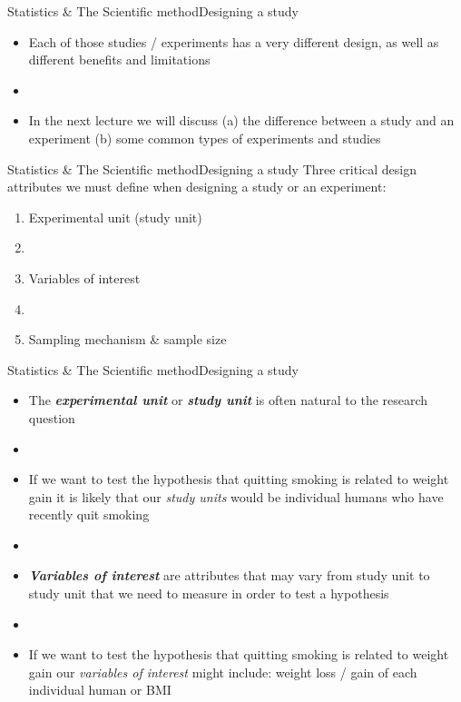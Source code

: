 \documentclass[xcolor=dvipsnames]{beamer}
\begin{document}
\begin{frame}{Statistics \& The Scientific method}{Designing a study}
	\vspace{-12pt}
	\begin{itemize}
		\item Each of those studies / experiments has a very different design, as well as different benefits and limitations  \pause
		\item[] 
		\item In the next lecture we will discuss (a) the difference between a study and an experiment (b) some common types of experiments and studies
	\end{itemize}
\end{frame}

\begin{frame}{Statistics \& The Scientific method}{Designing a study}
	\vspace{-12pt}
	Three critical design attributes we must define when designing a study or an experiment: \pause
	\begin{enumerate}
		\item Experimental unit (study unit) \pause
		\item[]
		\item Variables of interest \pause
		\item[]
		\item Sampling mechanism \& sample size
	\end{enumerate}
\end{frame}

\begin{frame}{Statistics \& The Scientific method}{Designing a study}
	\vspace{-12pt}
	\begin{itemize}
		\item The \textbf{\emph{experimental unit}} or \textbf{\emph{study unit}} is often natural to the research question \pause
		\item[]
		\item If we want to test the hypothesis that quitting smoking is related to weight gain it is likely that our \emph{study units} would be individual humans who have recently quit smoking \pause
		\item[]
		\item \textbf{\emph{Variables of interest}} are attributes that may vary from study unit to study unit that we need to measure in order to test a hypothesis \pause
		\item[]
		\item If we want to test the hypothesis that quitting smoking is related to weight gain our \emph{variables of interest} might include: weight loss / gain of each individual human or BMI
	\end{itemize}
\end{frame}
\end{document}
